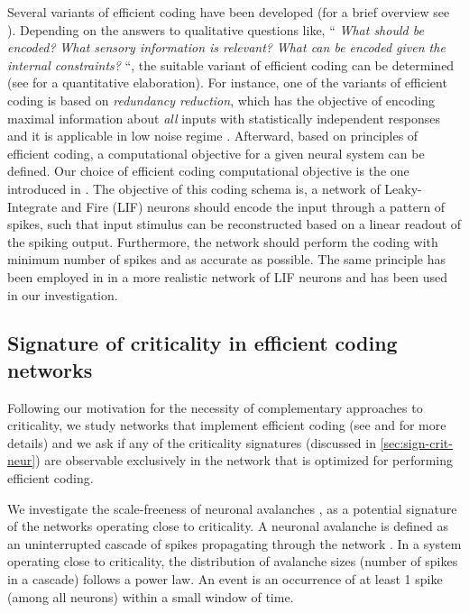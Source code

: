 Several variants of efficient coding have been develop\-ed
(for a brief over\-view see \cite{chalkUnifiedTheoryEfficient2018}).
Depending on the answers to qualitative questions like,
``
\emph{What should be encoded?}
\emph{What sensory information is relevant?}
\emph{What can be encoded given the internal constraints?}
``,
the suitable variant of efficient coding can be determined
(see \citet{chalkUnifiedTheoryEfficient2018} for a quantitative elaboration).
For instance, one of the variants of efficient coding is based on \emph{redundancy reduction},
which has the  objective of encoding maximal information about \emph{all} inputs with statistically independent responses and it is applicable in low noise regime \cite{chalkUnifiedTheoryEfficient2018}.
% 
% 
Afterward, based on principles of efficient coding, a computational objective for a given neural system can be defined.
Our choice of efficient coding computational objective is the one introduced in \citet{boerlinPredictiveCodingDynamical2013}.
The objective of this coding schema is,
a network of Leaky-Integrate and Fire (LIF) neurons should encode the input through a pattern of spikes,
such that input stimulus can be reconstructed based on a linear readout of the spiking output.
Furthermore, the network should perform the coding with minimum number of spikes and as accurate as possible.
The same principle has been employed in \citet{chalkNeuralOscillationsSignature2016} in a more realistic network of LIF neurons and has been used in our investigation.


\subsection{Signature of criticality in efficient coding networks}

Following our motivation for the necessity of complementary approaches to criticality,
we study networks that implement efficient coding
(see \citet{boerlinPredictiveCodingDynamical2013} and \citet{chalkNeuralOscillationsSignature2016} for more details)
and we ask if any of the  criticality signatures
(discussed in \autoref{sec:sign-crit-neur})
are observable exclusively in the network that is optimized for performing  efficient coding.

We investigate the scale-freeness of neuronal avalanches \cite{beggsNeuronalAvalanchesNeocortical2003},
as a potential signature of the networks operating close to criticality.
A neuronal avalanche is defined as an uninterrupted cascade of spikes propagating through the network \cite{beggsNeuronalAvalanchesNeocortical2003}.
In a system operating close to criticality, the distribution of avalanche sizes (number of spikes in a cascade) follows a power law.
An event is an occurrence of at least 1 spike (among all neurons) within a small window of time.


